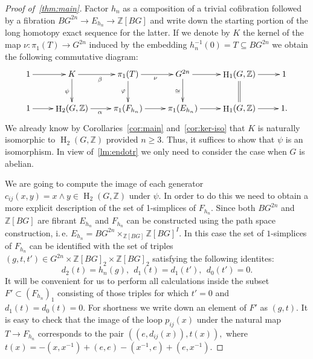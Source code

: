 \documentclass[oneside, 10pt]{amsart}
\makeatletter
\theoremstyle{plain}
\numberwithin{equation}{section}
\numberwithin{lemma}{section}
\theoremstyle{remark}
\theoremstyle{definition}
\DeclareMathOperator{\HH}{H}
\newcommand{\ZZ}{\mathbb{Z}}
\newcommand{\pullbackcorner}[1][dr]{\save*!/#1-1.2pc/#1:(-1,1)@^{|-}\restore}
\makeatother
\begin{document}
\begin{proof}[Proof of~\cref{thm:main}]
\begin{comment}Factor $h_n$ as a composition of a trivial cofibration followed by a fibration: 
\begin{equation} \label{eq:fibr-repl} \xymatrix{BG^{2n} \ar@{^{(}->}[r] & E_{h_n} \ar@{->>}^(.45){ev_1 \circ \pi_2}[r] & \ZZ[BG]} \end{equation}
For example, we can define $E_{h_n}$ and the homotopy fiber $F_{h_n}$ via the usual path space construction
 (here we use the fact that $BG$ and $\ZZ[BG]$ are fibrant).
\[ \xymatrix{ E_{h_n}  \ar[r]_{\pi_2} \ar[d]_{\pi_1} \pullbackcorner & \ar[d]^{ev_0} \ZZ[BG]^I\\
              BG^{2n} \ar[r]_{h_n} & \ZZ[BG] } \ \ \ 
   \xymatrix{ F_{h_n}  \ar[r] \ar[d] \pullbackcorner & \ar[d]^{ev_1\,\circ\,\pi_2} E_{h_n} \\
              pt \ar[r]_{0} & \ZZ[BG]}  \]
\end{comment}              
Factor $h_n$ as a composition of a trivial cofibration followed by a fibration $BG^{2n}\to E_{h_n} \to \ZZ[BG]$ and
write down the starting portion of the long homotopy exact sequence for the latter.
If we denote by $K$ the kernel of the map $\nu\colon \pi_1(T) \to G^{2n}$ induced by the embedding $h_n^{-1}(0)=T \subseteq BG^{2n}$ we obtain the following commutative diagram:
\[ \xymatrix{1 \ar[r] & K       \ar[d]_{\psi} \ar[r]_{\beta} & \pi_1(T) \ar[d]_{\varphi} \ar[r]_{\nu}     & G^{2n} \ar[r] \ar[d]_{\cong} & \HH_1(G, \ZZ) \ar[r] \ar@{=}[d] & 1 \\
             1 \ar[r] & \HH_2(G, \ZZ) \ar[r]_{\alpha} & \pi_1(F_{h_n})           \ar[r]  & \pi_1(E_{h_n}) \ar[r]                       & \HH_1(G, \ZZ) \ar[r] & 1.}\]
We already know by Corollaries~\ref{cor:main} and~\ref{cor:ker-iso} that $K$ is naturally isomorphic to $\HH_2(G, \ZZ)$ provided $n\geq 3$.
Thus, it suffices to show that $\psi$ is an isomorphism. In view of~\cref{lm:endotr} we only need to consider the case when $G$ is abelian.

We are going to compute the image of each generator $c_{ij}(x, y) = x \wedge y \in \HH_2(G, \ZZ)$ under $\psi$.
In order to do this we need to obtain a more explicit description of the set of 1-simplices of $F_{h_n}$.
Since both $BG^{2n}$ and $\ZZ[BG]$ are fibrant $E_{h_n}$ and $F_{h_n}$ can be constructed using the path space construction, i.\,e. $E_{h_n} = BG^{2n} \times_{\ZZ[BG]} \ZZ[BG]^I$.
In this case the set of $1$-simplices of $F_{h_n}$ can be identified with the set of triples $(g, t, t') \in G^{2n}\times \ZZ[BG]_2 \times \ZZ[BG]_2$ 
 satisfying the following identites:
\[d_2(t) = h_n(g),\ \ d_1(t) = d_1(t'),\ \ d_0(t') = 0.\]
It will be convenient for us to perform all calculations inside the subset $F'\subset (F_{h_n})_1$ consisting of those triples for which $t'=0$ and $d_1(t)=d_0(t)=0$.
For shortness we write down an element of $F'$ as $(g, t)$.
It is easy to check that the image of the loop $p_{ij}(x)$ under the natural map $T \to F_{h_n}$ corresponds to the pair
$((e, d_{ij}(x)), t(x)),$ where $t(x)=-(x, x^{-1}) + (e, e) - (x^{-1}, e) + (e, x^{-1})$.


\end{proof}
\end{document}
